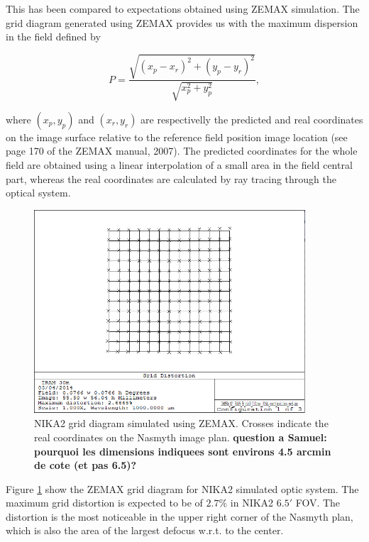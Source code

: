 This has been compared to expectations obtained using ZEMAX
simulation. The grid diagram generated using ZEMAX provides us with
the maximum dispersion in the field defined by

\begin{equation}
P = \frac{\sqrt{(x_p - x_r)^2 + (y_p - y_r)^2}}{\sqrt{x_p^2 + y_p^2}},
\end{equation}

where $(x_p, y_p)$ and $(x_r, y_r)$ are respectivelly the predicted
and real coordinates on the image surface relative to the reference
field position image location (see page 170 of the ZEMAX manual, 2007).
The predicted coordinates for the whole field are obtained using a
linear interpolation of a small area in the field central part,
whereas the real coordinates are calculated by ray tracing through the
optical system.

\begin{figure}[ht] 
\begin{center}
\includegraphics[width=0.9\textwidth]{Figures/NIKA2_Final_grid.png}
\caption[Simulated FOV grid]{NIKA2 grid diagram simulated using ZEMAX. Crosses indicate
  the real coordinates on the Nasmyth image plan. {\bf question a
    Samuel: pourquoi les dimensions indiquees sont environs 4.5 arcmin
  de cote (et pas 6.5)?}}
 \label{fig:fov_grid_distortion_zemax}
\end{center}
\end{figure}

Figure \ref{fig:fov_grid_distortion_zemax} show the ZEMAX grid diagram for
NIKA2 simulated optic system. The maximum grid distortion is expected
to be of $2.7\%$ in NIKA2 $6.5'$ FOV. The distortion is the most
noticeable in the upper right corner of the Nasmyth plan, which is
also the area of the largest defocus w.r.t. to the center. 


